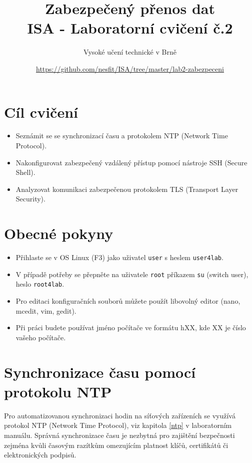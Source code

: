 \documentclass[a4paper,11pt]{article}
\title{Zabezpečený přenos dat\\
{\bf\large ISA - Laboratorní cvičení č.2}}
\author{Vysoké učení technické v Brně}
\date{\url{https://github.com/nesfit/ISA/tree/master/lab2-zabezpeceni}}
\begin{document}
{\let\newpage\relax\maketitle}

\section*{Cíl cvičení}
\begin{itemize}
  \item Seznámit se se synchronizací času a protokolem NTP (Network Time Protocol).
  \item Nakonfigurovat zabezpečený vzdálený přístup pomocí nástroje SSH (Secure Shell).
  \item Analyzovat komunikaci zabezpečenou protokolem TLS (Transport Layer Security).
\end{itemize}

\section*{Obecné pokyny}
\begin{itemize}
  \item Přihlaste se v OS Linux (F3) jako uživatel {\tt user} s heslem {\tt user4lab}.
  \item V případě potřeby se přepněte na uživatele {\tt root} příkazem {\tt su}
  (switch user), heslo {\tt root4lab}.
  \item Pro editaci konfiguračních souborů můžete použít libovolný editor (nano, mcedit, vim, gedit).
  \item Při práci budete používat jméno počítače ve formátu hXX, kde XX je číslo vašeho počítače.
\end{itemize}

\section{Synchronizace času pomocí protokolu NTP}
Pro automatizovanou synchronizaci hodin na síťových zařízeních se využívá protokol NTP (Network Time Protocol), viz kapitola \ref{ntp} v laboratorním manuálu. Správná synchronizace  času je nezbytná pro zajištění bezpečnosti zejména kvůli časovým razítkům omezujícím platnost klíčů, certifikátů či elektronických podpisů.
\end{document}

